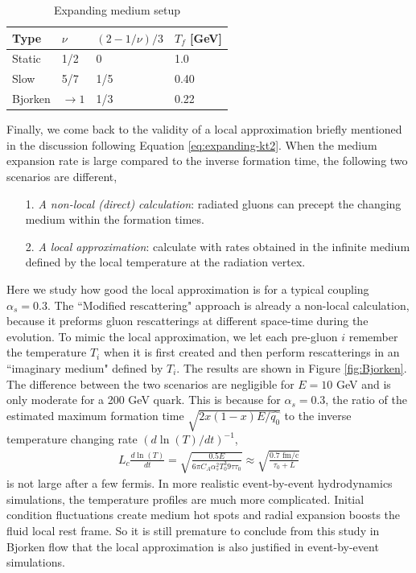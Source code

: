 \documentclass[aps, prc, reprint, amsmath, groupedaddress, nofootinbib]{revtex4-1}
\begin{document}
{\begin{center}
\begin{table}[h]
\caption{Expanding medium setup}\label{tab:expand}
\begin{tabularx}{\columnwidth}{XXXX}
\hline
Type & $\nu$ & $(2-1/\nu)/3$ & $T_f$ [GeV]\\ 
\hline
Static & 1/2 & 0 & 1.0\\
\hline
Slow & 5/7 & 1/5 & 0.40\\
\hline
Bjorken & $\rightarrow 1$ & 1/3 & 0.22\\
\hline
\end{tabularx} 
\end{table}
\end{center}

Finally, we come back to the validity of a local approximation briefly mentioned in the discussion following Equation \ref{eq:expanding-kt2}.
When the medium expansion rate is large compared to the inverse formation time, the following two scenarios are different,
\begin{itemize}
\item[1.]  {\it A non-local (direct) calculation}: radiated gluons can precept the changing medium within the formation times.
\item[2.] {\it A local approximation}: calculate with rates obtained in the infinite medium defined by the local temperature at the radiation vertex.
\end{itemize} 
Here we study how good the local approximation is for a typical coupling $\alpha_s = 0.3$.
The ``Modified rescattering" approach is already a non-local calculation, because it preforms gluon rescatterings at different space-time during the evolution. 
To mimic the local approximation, we let each pre-gluon $i$ remember the temperature $T_i$ when it is first created and then perform rescatterings in an ``imaginary medium" defined by $T_i$.
The results are shown in Figure \ref{fig:Bjorken}. 
The difference between the two scenarios are negligible for $E=10$ GeV and is only moderate for a 200 GeV quark.
This is because for $\alpha_s = 0.3$, the ratio of the estimated maximum formation time $\sqrt{2x(1-x)E/\hat{q_0}}$ to the inverse temperature changing rate $(d\ln(T)/dt)^{-1}$,
\begin{eqnarray}
L_c \frac{d\ln(T)}{dt} = \sqrt{\frac{0.5 E}{6\pi C_A\alpha_s^2 T_0^3 9\tau\tau_0}} \approx \sqrt{\frac{0.7 \textrm{ fm/c}}{\tau_0+L}}
\end{eqnarray}
is not large after a few fermis. 
In more realistic event-by-event hydrodynamics simulations, the temperature profiles are much more complicated.
Initial condition fluctuations create medium hot spots and radial expansion boosts the fluid local  rest frame.
So it is still premature to conclude from this study in Bjorken flow that the local approximation is also justified in event-by-event simulations.


}
\end{document}
